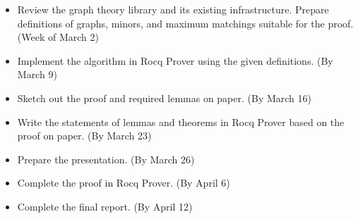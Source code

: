 \documentclass[acmsmall, screen, nonacm]{acmart}
\begin{document}
\begin{itemize}
	\item Review the graph theory library and its existing infrastructure. Prepare definitions of graphs, minors, and maximum matchings suitable for the proof. (Week of March 2)
	\item Implement the algorithm in Rocq Prover using the given definitions. (By March 9)
	\item Sketch out the proof and required lemmas on paper. (By March 16)
	\item Write the statements of lemmas and theorems in Rocq Prover based on the proof on paper. (By March 23)
	\item Prepare the presentation. (By March 26)
	\item Complete the proof in Rocq Prover. (By April 6)
	\item Complete the final report. (By April 12)
\end{itemize}


{}
\end{document}
